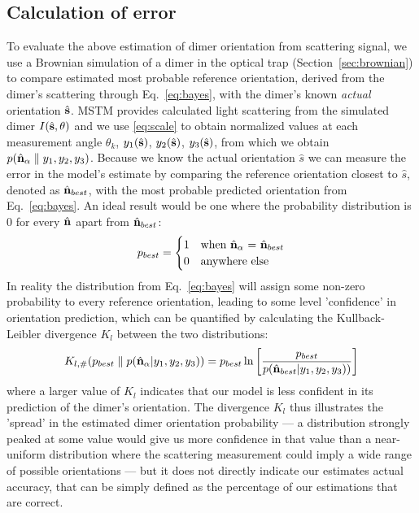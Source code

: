 \subsection{Calculation of error}
\label{sec:divergence}
To evaluate the above estimation of dimer orientation from scattering signal, we use a Brownian simulation of a dimer in the optical trap (Section~\ref{sec:brownian}) to compare estimated most probable reference orientation, derived from the dimer's scattering through Eq.~\eqref{eq:bayes}, with the dimer's known \emph{actual} orientation $\hat{\bf s}$. MSTM provides calculated light scattering from the simulated dimer $I(\hat{\bf s}, \theta)$ and we use \eqref{eq:scale} to obtain normalized values at each measurement angle $\theta_k$,  $y_1(\hat{\bf s})$, $y_2(\hat{\bf s})$, $y_3(\hat{\bf s})$, from which we obtain $p(\hat{\bf n}_{\alpha}\parallel y_1, y_2, y_3)$. Because we know the actual orientation $\hat{s}$ we can measure the error in the model's estimate by comparing the reference orientation closest to $\hat{s}$, denoted as $\hat{\bf n}_{best}$, with the most probable predicted orientation from Eq.~\eqref{eq:bayes}. An ideal result would be one where the probability distribution is 0 for every $\hat{\bf n}$ apart from $\hat{\bf n}_{best}$:
\begin{align}
	\label{eq:best}
	p_{best} = 
	\begin{cases}
		1 & \text{when $\hat{\bf n}_\alpha$ = $\hat{\bf n}_{best}$}\\
		0 & \text{anywhere else}
	\end{cases}
\end{align}
In reality the distribution from Eq.~\eqref{eq:bayes} will assign some non-zero
probability to every reference orientation, leading to some level 'confidence' in orientation prediction, which can be quantified by calculating the Kullback-Leibler divergence $K_l$ between the two distributions:
\begin{align}
	K_{l, \#}(p_{best}\parallel p(\hat{\bf n}_\alpha| y_1, y_2, y_3))
	= p_{best}\ln \left[\frac{p_{best}}{p(\hat{\bf n}_{best}| y_1,y_2,y_3))}
	\right]
	\label{eq;kullback}
\end{align}
where a larger value of $K_l$ indicates that our model is less confident in its
prediction of the dimer's orientation. The divergence $K_l$ thus illustrates the 'spread'
in the estimated dimer orientation probability --- a distribution strongly peaked at 
some value would give us more confidence in that value than a near-uniform distribution 
where the scattering measurement could imply a wide range of possible orientations --- 
but it does not directly indicate our estimates actual accuracy, that can be simply defined as the percentage of our estimations that are correct. 

